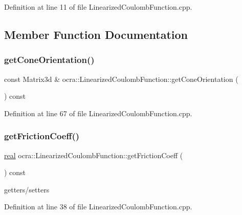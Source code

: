 Definition at line 11 of file Linearized\+Coulomb\+Function.\+cpp.



\subsection{Member Function Documentation}
\hypertarget{classocra_1_1LinearizedCoulombFunction_af503cd2489d6cdc131e5bbd526586954}{}\label{classocra_1_1LinearizedCoulombFunction_af503cd2489d6cdc131e5bbd526586954} 
\subsubsection{\texorpdfstring{get\+Cone\+Orientation()}{getConeOrientation()}}
{\footnotesize\ttfamily const Matrix3d \& ocra\+::\+Linearized\+Coulomb\+Function\+::get\+Cone\+Orientation (\begin{DoxyParamCaption}{ }\end{DoxyParamCaption}) const}



Definition at line 67 of file Linearized\+Coulomb\+Function.\+cpp.

\hypertarget{classocra_1_1LinearizedCoulombFunction_a392b8054e54449a81202ae9682211d32}{}\label{classocra_1_1LinearizedCoulombFunction_a392b8054e54449a81202ae9682211d32} 
\subsubsection{\texorpdfstring{get\+Friction\+Coeff()}{getFrictionCoeff()}}
{\footnotesize\ttfamily \hyperlink{namespaceocra_af4478308ca113669e67d72f9a3050469}{real} ocra\+::\+Linearized\+Coulomb\+Function\+::get\+Friction\+Coeff (\begin{DoxyParamCaption}{ }\end{DoxyParamCaption}) const}

getters/setters 

Definition at line 38 of file Linearized\+Coulomb\+Function.\+cpp.

